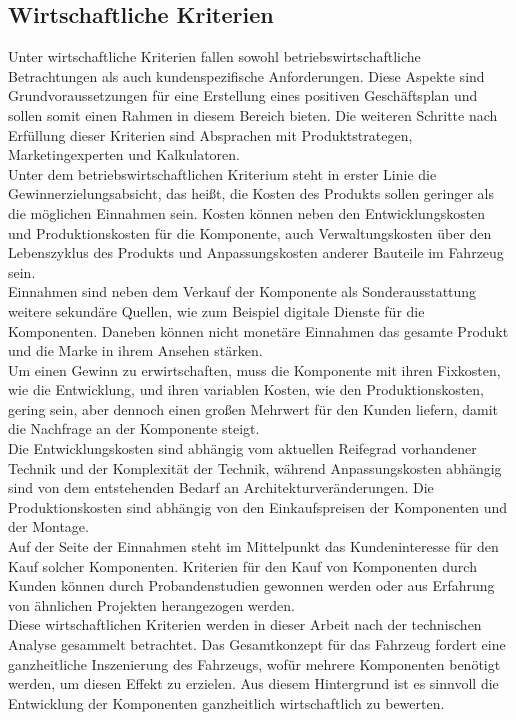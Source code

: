 \subsection{Wirtschaftliche Kriterien}
Unter wirtschaftliche Kriterien fallen sowohl betriebswirtschaftliche Betrachtungen als auch kundenspezifische Anforderungen. Diese Aspekte sind Grundvoraussetzungen für eine Erstellung eines positiven Geschäftsplan und sollen somit einen Rahmen in diesem Bereich bieten. Die weiteren Schritte nach Erfüllung dieser Kriterien sind Absprachen mit Produktstrategen, Marketingexperten und Kalkulatoren. \\
Unter dem betriebswirtschaftlichen Kriterium steht in erster Linie die Gewinnerzielungsabsicht, das heißt, die Kosten des Produkts sollen geringer als die möglichen Einnahmen sein. Kosten können neben den Entwicklungskosten und Produktionskosten für die Komponente, auch Verwaltungskosten über den Lebenszyklus des Produkts und Anpassungskosten anderer Bauteile im Fahrzeug sein. \\
Einnahmen sind neben dem Verkauf der Komponente als Sonderausstattung weitere sekundäre Quellen, wie zum Beispiel digitale Dienste für die Komponenten. Daneben können nicht monetäre Einnahmen das gesamte Produkt und die Marke in ihrem Ansehen stärken.\\
Um einen Gewinn zu erwirtschaften, muss die Komponente mit ihren Fixkosten, wie die Entwicklung, und ihren variablen Kosten, wie den Produktionskosten, gering sein, aber dennoch einen großen Mehrwert für den Kunden liefern, damit die Nachfrage an der Komponente steigt. \\
Die Entwicklungskosten sind abhängig vom aktuellen Reifegrad vorhandener Technik und der Komplexität der Technik, während Anpassungskosten abhängig sind von dem entstehenden Bedarf an Architekturveränderungen. Die Produktionskosten sind abhängig von den Einkaufspreisen der Komponenten und der Montage. \\
Auf der Seite der Einnahmen steht im Mittelpunkt das Kundeninteresse für den Kauf solcher Komponenten. Kriterien für den Kauf von Komponenten durch Kunden können durch Probandenstudien gewonnen werden oder aus Erfahrung von ähnlichen Projekten herangezogen werden. \\
Diese wirtschaftlichen Kriterien werden in dieser Arbeit nach der technischen Analyse gesammelt betrachtet. Das Gesamtkonzept für das Fahrzeug fordert eine ganzheitliche Inszenierung des Fahrzeugs, wofür mehrere Komponenten benötigt werden, um diesen Effekt zu erzielen. Aus diesem Hintergrund ist es sinnvoll die Entwicklung der Komponenten ganzheitlich wirtschaftlich zu bewerten. \\
